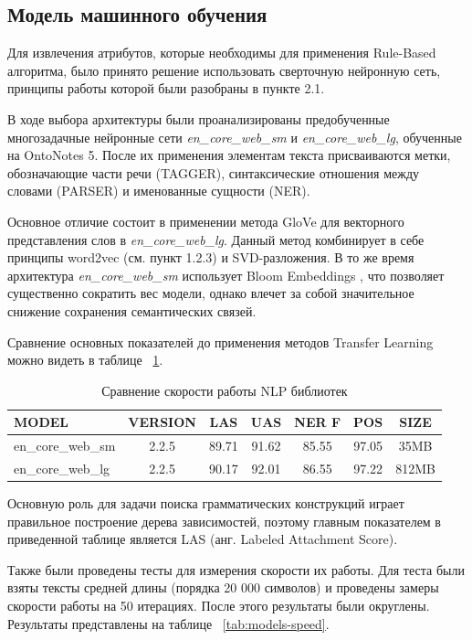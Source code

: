 \newpage
\subsection{Модель машинного обучения}
Для извлечения атрибутов, которые необходимы для применения Rule-Based алгоритма, было принято решение использовать сверточную нейронную сеть, принципы работы которой были разобраны в пункте 2.1.

В ходе выбора архитектуры были проанализированы предобученные многозадачные нейронные сети \emph{en\_core\_web\_sm} и  \emph{en\_core\_web\_lg}, обученные на OntoNotes 5. После их применения элементам текста присваиваются метки, обозначающие части речи (TAGGER), синтаксические отношения между словами (PARSER) и именованные сущности (NER).

Основное отличие состоит в применении метода GloVe \autocite{pennington2014glove} для векторного представления слов в \emph{en\_core\_web\_lg}. Данный метод комбинирует в себе принципы word2vec (см. пункт 1.2.3) и SVD-разложения. В то же время архитектура \emph{en\_core\_web\_sm} использует Bloom Embeddings \autocite{DBLP:journals/corr/SerraK17}, что позволяет существенно сократить вес модели, однако влечет за собой значительное снижение сохранения семантических связей. 

Сравнение основных показателей до применения методов Transfer Learning можно видеть в таблице ~\ref{tab:nlp-characteristics}.

\begin{table}
\centering
\caption{\label{tab:nlp-characteristics}Сравнение скорости работы NLP библиотек}
\begin{tabular}{@{}lcccccc@{}}
\toprule
MODEL             & VERSION & LAS   & UAS   & NER F & POS   & SIZE  \\ \midrule
en\_core\_web\_sm & 2.2.5   & 89.71 & 91.62 & 85.55 & 97.05 & 35MB  \\
en\_core\_web\_lg & 2.2.5   & 90.17 & 92.01 & 86.55 & 97.22 & 812MB \\ \bottomrule
\end{tabular}
\end{table}
Основную роль для задачи поиска грамматических конструкций играет правильное построение дерева зависимостей, поэтому главным показателем в приведенной таблице является LAS (анг. Labeled Attachment Score).

Также были проведены тесты для измерения скорости их работы. Для теста были взяты тексты средней длины (порядка 20 000 символов) и проведены замеры скорости работы на 50 итерациях. После этого результаты были округлены. Результаты представлены на таблице ~\ref{tab:models-speed}.

